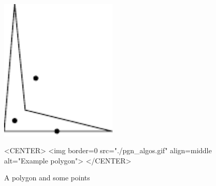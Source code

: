 \begin{figure}
\begin{ccTexOnly}
\includegraphics[width=0.5\textwidth]{Polygon/pgn_algos}
\end{ccTexOnly}
\begin{ccHtmlOnly}
<CENTER>
<img border=0 src="./pgn_algos.gif" align=middle alt="Example polygon">
</CENTER>
\end{ccHtmlOnly}
\caption{A polygon and some points
\label{I1_Fig_a_polygon}}
\end{figure}

